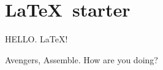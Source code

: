 \documentclass[oneside,a4paper]{article}
\begin{document}
\section[start]{\LaTeX \ starter}
\begin{center}
HELLO. \LaTeX!
\end{center}
Avengers, Assemble.
How are you doing?
\end{document}
